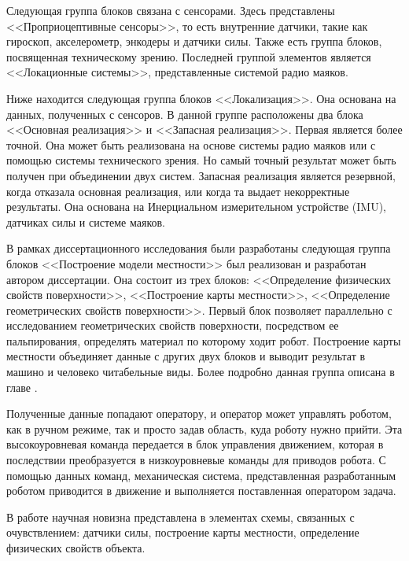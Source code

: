 Следующая группа блоков связана с сенсорами. Здесь представлены <<Проприоцептивные сенсоры>>, то есть внутренние датчики, такие как гироскоп, акселерометр, энкодеры и датчики силы. Также есть группа блоков, посвященная техническому зрению. Последней группой элементов является <<Локационные системы>>, представленные системой радио маяков. 

Ниже находится следующая группа блоков <<Локализация>>. Она основана на данных, полученных с сенсоров. В данной группе расположены два блока <<Основная реализация>> и <<Запасная реализация>>. Первая является более точной. Она может быть реализована на основе системы радио маяков или с помощью системы технического зрения. Но самый точный результат может быть получен при объединении двух систем. Запасная реализация является резервной, когда отказала основная реализация, или когда та выдает некорректные результаты. Она основана на Инерциальном измерительном устройстве (IMU), датчиках силы и системе маяков.

В рамках диссертационного исследования были разработаны следующая группа блоков <<Построение модели местности>> был реализован и разработан автором диссертации. Она состоит из трех блоков: <<Определение физических свойств поверхности>>, <<Построение карты местности>>, <<Определение геометрических свойств поверхности>>. Первый блок позволяет параллельно с исследованием геометрических свойств поверхности, посредством ее пальпирования, определять материал по которому ходит робот. Построение карты местности объединяет данные с других двух блоков и выводит результат в машино и человеко читабельные виды. Более подробно данная группа описана в главе .

Полученные данные попадают оператору, и оператор может управлять роботом, как в ручном режиме, так и просто задав область, куда роботу нужно прийти. Эта высокоуровневая команда передается в блок управления движением, которая в последствии преобразуется в низкоуровневые команды для приводов робота. С помощью данных команд, механическая система, представленная разработанным роботом приводится в движение и выполняется поставленная оператором задача.

В работе научная новизна представлена в элементах схемы, связанных с очувствлением: датчики силы, построение карты местности, определение физических свойств объекта.
